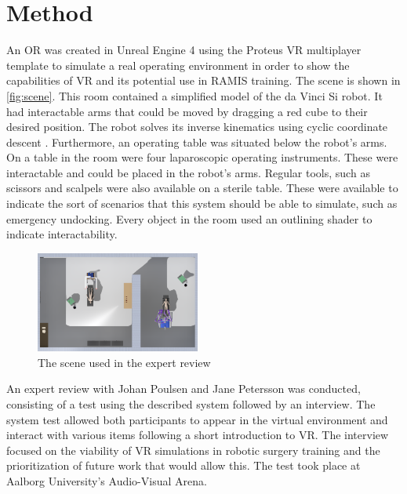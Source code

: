 \documentclass[conference]{IEEEtran}
\begin{document}
\section{Method}
An OR was created in Unreal Engine 4 using the Proteus VR multiplayer template to simulate a real operating environment in order to show the capabilities of VR and its potential use in RAMIS training. The scene is shown in \autoref{fig:scene}. This room contained a simplified model of the da Vinci Si robot. It had interactable arms that could be moved by dragging a red cube to their desired position. The robot solves its inverse kinematics using cyclic coordinate descent \citep{wang_combined_1991}. Furthermore, an operating table was situated below the robot's arms. On a table in the room were four laparoscopic operating instruments. These were interactable and could be placed in the robot's arms. Regular tools, such as scissors and scalpels were also available on a sterile table. These were available to indicate the sort of scenarios that this system should be able to simulate, such as emergency undocking. Every object in the room used an outlining shader to indicate interactability. 

\begin{figure}[tp]
\centering
\includegraphics[width=0.48\textwidth]{Figures/Scene.PNG}
\caption{The scene used in the expert review}
\label{fig:scene}
\end{figure}

An expert review with Johan Poulsen and Jane Petersson was conducted, consisting of a test using the described system followed by an interview. The system test allowed both participants to appear in the virtual environment and interact with various items following a short introduction to VR. The interview focused on the viability of VR simulations in robotic surgery training and the prioritization of future work that would allow this. The test took place at Aalborg University's Audio-Visual Arena.
\end{document}
